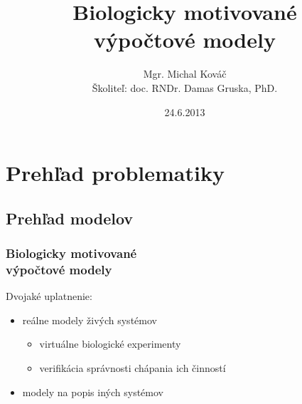\usepackage[utf8]{inputenc}

\usepackage{bibentry}
\nobibliography*
\usepackage{slovak}
\usepackage{tikz}
\usetikzlibrary{arrows,positioning}
\title{Biologicky motivované \\výpočtové modely}
\author[Mgr. Michal Kováč]{Mgr. Michal Kováč\\{\small Školiteľ: doc. RNDr. Damas Gruska, PhD.}}
\date{24.6.2013}


\begin{frame}[t]
\titlepage
\end{frame}

\begin{frame}
\tableofcontents
\end{frame}

\section{Prehľad problematiky} %
\label{sec:prehlad_problematiky}

\subsection{Prehľad modelov} %
\label{sub:prehlad_modelov}

\begin{frame}[t]\frametitle{Biologicky motivované \\výpočtové modely}
  Dvojaké uplatnenie:
  \begin{itemize}
    \item reálne modely živých systémov
    \begin{itemize}
      \item virtuálne biologické experimenty
      \item verifikácia správnosti chápania ich činností
    \end{itemize}
    \item modely na popis iných systémov
  \end{itemize}
\end{frame}

